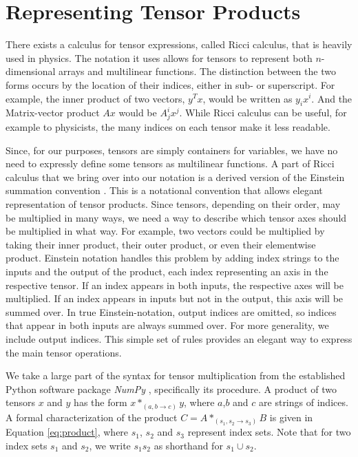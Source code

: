 \documentclass[12pt, a4paper]{report}
\begin{document}
\section{Representing Tensor Products}
There exists a calculus for tensor expressions, called Ricci calculus, that is heavily used in physics. \cite{ricci}
The notation it uses allows for tensors to represent both $n$-dimensional arrays and multilinear functions.
The distinction between the two forms occurs by the location of their indices, either in sub- or superscript.
For example, the inner product of two vectors, $y^Tx$, would be written as $y_ix^i$. And the Matrix-vector product $Ax$ would be $A^i_jx^j$.
While Ricci calculus can be useful, for example to physicists, the many indices on each tensor make it less readable.

Since, for our purposes, tensors are simply containers for variables, we have no need to expressly define some tensors as multilinear functions.
A part of Ricci calculus that we bring over into our notation is a derived version of the Einstein summation convention \cite{einstein}.
This is a notational convention that allows elegant representation of tensor products.
Since tensors, depending on their order, may be multiplied in many ways, we need a way to describe which tensor axes should be multiplied in what way.
For example, two vectors could be multiplied by taking their inner product, their outer product, or even their elementwise product.
Einstein notation handles this problem by adding index strings to the inputs and the output of the product, each index representing an axis in the respective tensor.
If an index appears in both inputs, the respective axes will be multiplied.
If an index appears in inputs but not in the output, this axis will be summed over.
In true Einstein-notation, output indices are omitted, so indices that appear in both inputs are always summed over. 
For more generality, we include output indices.
This simple set of rules provides an elegant way to express the main tensor operations.

We take a large part of the syntax for tensor multiplication from the established Python software package \textit{NumPy} \cite{numpy}, specifically its  procedure.
A product of two tensors $x$ and $y$ has the form $x*_{(a,b \rightarrow c)}y$, where $a$,$b$ and $c$ are strings of indices.
A formal characterization of the product $C = A *_{(s_1,s_2 \rightarrow s_3)} B$ is given in Equation \ref{eq:product}, where $s_1$, $s_2$ and $s_3$ represent index sets.
Note that for two index sets $s_1$ and $s_2$, we write $s_1 s_2$ as shorthand for $s_1 \cup s_2$.
\end{document}
